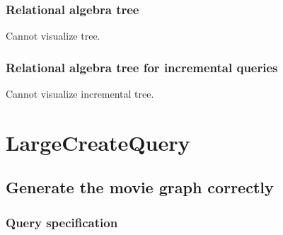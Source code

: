 	\subsubsection*{Relational algebra tree}

	Cannot visualize tree.

	\subsubsection*{Relational algebra tree for incremental queries}

	Cannot visualize incremental tree.

	\section{LargeCreateQuery}

	\subsection{Generate the movie graph correctly}

	\subsubsection*{Query specification}

